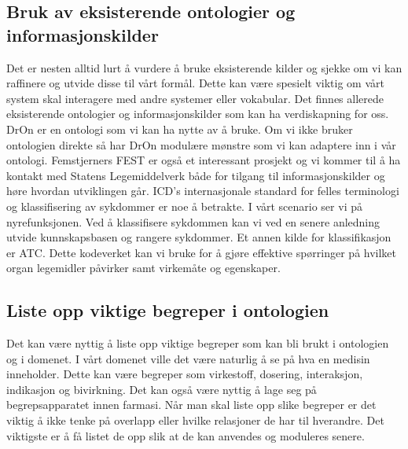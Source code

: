 \subsection{Bruk av eksisterende ontologier og informasjonskilder}
Det er nesten alltid lurt å vurdere å bruke eksisterende kilder og sjekke om vi kan raffinere og utvide disse til vårt formål. Dette kan være spesielt viktig om vårt system skal interagere med andre systemer eller vokabular. Det finnes allerede eksisterende ontologier og informasjonskilder som kan ha verdiskapning for oss. DrOn er en ontologi som vi kan ha nytte av å bruke. Om vi ikke bruker ontologien direkte så har DrOn modulære mønstre som vi kan adaptere inn i vår ontologi. Femstjerners FEST er også et interessant prosjekt og vi kommer til å ha kontakt med Statens Legemiddelverk både for tilgang til informasjonskilder og høre hvordan utviklingen går. ICD's internasjonale standard for felles terminologi og klassifisering av sykdommer er noe å betrakte. I vårt scenario ser vi på nyrefunksjonen. Ved å klassifisere sykdommen kan vi ved en senere anledning utvide kunnskapsbasen og rangere sykdommer. Et annen kilde for klassifikasjon er ATC. Dette kodeverket kan vi bruke for å gjøre effektive spørringer på hvilket organ legemidler påvirker samt virkemåte og egenskaper.

\subsection{Liste opp viktige begreper i ontologien}
Det kan være nyttig å liste opp viktige begreper som kan bli brukt i ontologien og i domenet. I vårt domenet ville det være naturlig å se på hva en medisin inneholder. Dette kan være begreper som virkestoff, dosering, interaksjon, indikasjon og bivirkning. Det kan også være nyttig å lage seg på begrepsapparatet innen farmasi. Når man skal liste opp slike begreper er det viktig å ikke tenke på overlapp eller hvilke relasjoner de har til hverandre. Det viktigste er å få listet de opp slik at de kan anvendes og moduleres senere.

